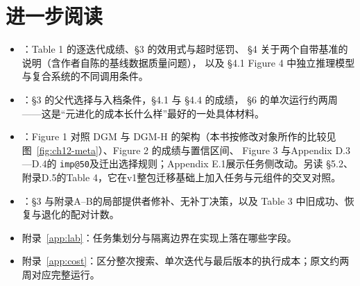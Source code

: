 \section*{进一步阅读}
\begin{itemize}[itemsep=2pt,topsep=4pt,parsep=0pt]
  \item \cite{sica-2504}：Table 1 的逐迭代成绩、§3 的效用式与超时惩罚、
        §4 关于两个自带基准的说明（含作者自陈的基线数据质量问题），
        以及 §4.1 Figure 4 中独立推理模型与复合系统的不同调用条件。
  \item \cite{dgm-2505}：§3 的父代选择与入档条件，§4.1 与 §4.4 的成绩，
        §6 的单次运行约两周——这是“元进化的成本长什么样”最好的一处具体材料。
  \item \cite{hyperagents-2603}：Figure 1 对照 DGM 与 DGM-H 的架构（本书按修改对象所作的比较见图~\ref{fig:ch12-meta}）、Figure 2 的成绩与置信区间、
        Figure 3 与Appendix D.3—D.4的 \texttt{imp@50}及迁出选择规则；Appendix E.1展示任务侧改动。另读\cite{hyperagents-2603-v2} §5.2、附录D.5的Table 4，它在v1整包迁移基础上加入任务与元组件的交叉对照。
  \item \cite{memscope-2610}：§3 与附录A--B的局部提供者修补、无补丁决策，以及 Table 3 中旧成功、恢复与退化的配对计数。
  \item 附录~\ref{app:lab}：任务集划分与隔离边界在实现上落在哪些字段。
  \item 附录~\ref{app:cost}：区分整次搜索、单次迭代与最后版本的执行成本；原文约两周对应完整运行。
\end{itemize}
